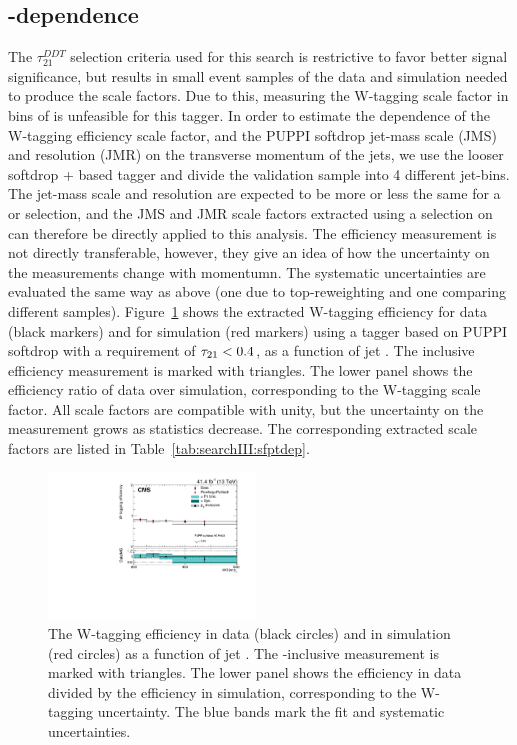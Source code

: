 \subsection{\PT-dependence}
\label{sec:searchIII:vtagpt}
The $\tau_{21}^{DDT}$ selection criteria used for this search is restrictive to favor better signal significance, but results in small event samples of the data and simulation needed to produce the scale factors. Due to this, measuring the W-tagging scale factor in bins of \PT is unfeasible for this tagger. In order to estimate the dependence of the W-tagging efficiency scale factor, and the PUPPI softdrop jet-mass scale (JMS) and resolution (JMR) on the transverse momentum of the jets, we use the looser softdrop + \nsubj based tagger and divide the validation sample into 4 different jet-\PT bins. The jet-mass scale and resolution are expected to be more or less the same for a \nsubj or \ddt selection, and the JMS and JMR scale factors extracted using a selection on \nsbj can therefore be directly applied to this analysis. The efficiency measurement is not directly transferable, however, they give an idea of how the uncertainty on the measurements change with momentumn. The systematic uncertainties are evaluated the same way as above (one due to top-\PT reweighting and one comparing different \ttbar samples). Figure~\ref{fig:searchIII:sfvspt} shows the extracted W-tagging efficiency for data (black markers) and for simulation (red markers) using a tagger based on PUPPI softdrop with a requirement of $\tau_{21}<0.4$, as a function of jet \PT. The inclusive efficiency measurement is marked with triangles. The lower panel shows the efficiency ratio of data over simulation, corresponding to the W-tagging scale factor. All scale factors are compatible with unity, but the uncertainty on the measurement grows as statistics decrease. The corresponding extracted scale factors are listed in Table~\ref{tab:searchIII:sfptdep}.
 \begin{figure}[h!]
 \centering
 \includegraphics[width=0.49\textwidth]{figures/vtagging/2017_sf/sd_vPt.pdf}
 \caption{The W-tagging efficiency in data (black circles) and in simulation (red circles) as a function of jet \PT. The \PT-inclusive measurement is marked with triangles. The lower panel shows the efficiency in data divided by the efficiency in simulation, corresponding to the W-tagging uncertainty. The blue bands mark the fit and systematic uncertainties.}
 \label{fig:searchIII:sfvspt}
 \end{figure}
